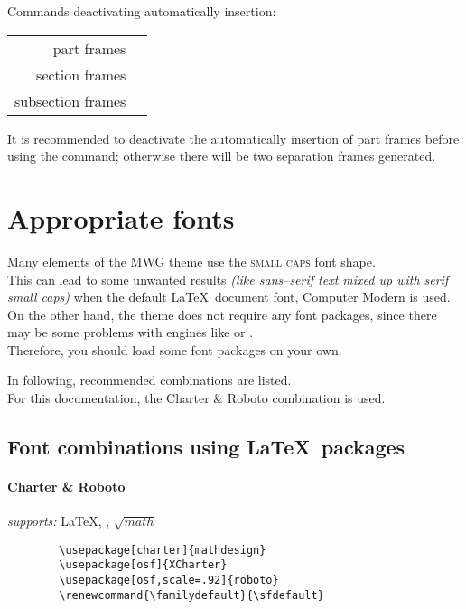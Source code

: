 \documentclass[11pt]{ltxdoc}
\begin{document}
	\bigskip
	Commands deactivating automatically insertion: \\[\smallskipamount]\nopagebreak
	\begin{tabular}{rl}
		part frames & \texttt{\deactivatepartframes} \\
		section frames & \texttt{\deactivatesectionframes} \\
		subsection frames & \texttt{\deactivatesubsectionframes}
	\end{tabular}
	
	\bigskip
	It is recommended to deactivate the automatically insertion of part frames before using the \texttt{\appendix} command; otherwise there will be two separation frames generated.
	
	
	\section{Appropriate fonts}
	Many elements of the MWG theme use the \textsc{small caps} font shape. \\
	This can lead to some unwanted results \textit{(like sans--serif text mixed up with serif small caps)} when the default \LaTeX\ document font, Computer Modern is used. \\
	On the other hand, the theme does not require any font packages, since there may be some problems with engines like  or . \\
	Therefore, you should load some font packages on your own.
	
	\smallskip
	In following, recommended combinations are listed. \\
	For this documentation, the Charter \& \textsf{Roboto} combination is used.
	
	
	\subsection{Font combinations using \LaTeX\ packages}
	\raggedleft
	\paragraph*{Charter \& Roboto} \hfill
	\textit{supports:} \LaTeX, , $\sqrt{math}$ \nopagebreak\vspace{-.75em}
	\begin{verbatim}
		\usepackage[charter]{mathdesign}
		\usepackage[osf]{XCharter}
		\usepackage[osf,scale=.92]{roboto}
		\renewcommand{\familydefault}{\sfdefault}
	\end{verbatim}
	
\end{document}
